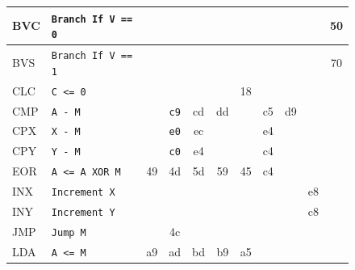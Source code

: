 \documentclass[
	12pt,				  %
	openright,		%
	a4paper,			%
	english,			%
	french,				%
	spanish,			%
	brazil,				%
]{abntex2}
\newcommand{\codenobg}[1]{\texttt{#1}}
\begin{document}
\begin{figure}
\begin{longtable}{|l|p{4cm}|c|c|c|c|c|c|c|c|c|}
		BVC                & \codenobg{Branch If V == 0}   &             &               &               &              &             &                &            &               & 50           \\ \hline
		BVS                & \codenobg{Branch If V == 1}   &             &               &               &              &             &                &            &               & 70           \\ \hline
		CLC                & \codenobg{C <= 0}             &             &               &               &              & 18          &                &            &               &              \\ \hline
		CMP                & \codenobg{A - M}              &             & \codenobg{c9} & cd            & dd           &             & c5             & d9         &               &              \\ \hline
		CPX                & \codenobg{X - M}              &             & \codenobg{e0} & ec            &              &             & e4             &            &               &              \\ \hline
		CPY                & \codenobg{Y - M}              &             & \codenobg{c0} & e4            &              &             & c4             &            &               &              \\ \hline
		EOR                & \codenobg{A <= A XOR M}       & 49          & 4d            & 5d            & 59           & 45          & c4             &            &               &              \\ \hline
		INX                & \codenobg{Increment X}        &             &               &               &              &             &                &            & e8            &              \\ \hline
		INY                & \codenobg{Increment Y}        &             &               &               &              &             &                &            & c8            &              \\ \hline
		JMP                & \codenobg{Jump M}             &             & 4c            &               &              &             &                &            &               &              \\ \hline
		LDA                & \codenobg{A <= M}             & a9          & ad            & bd            & b9           & a5          &                &            &               &              \\ \hline

\end{longtable}
\end{figure}
\end{document}
